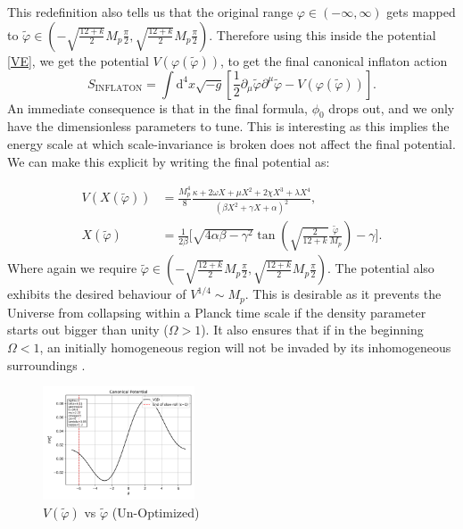 \documentclass[aps,prd,reprint,preprintnumbers,showpacs,floatfix,nofootinbib,superscript address]{revtex4-2}
\newcommand{\wb}[1]{{\color[RGB]{255,0,0}{\textbf{\textit{[WB: #1]}}}}}
\begin{document}
This redefinition also tells us that the original range $\varphi \in (-\infty,\infty)$ gets mapped to $\tilde{\varphi} \in \left( -\sqrt{\frac{12 + k}{2}}M_p \frac{\pi}{2},\sqrt{\frac{12 + k}{2}}M_p \frac{\pi}{2} \right)$. Therefore using this inside the potential \cref{VE}, we get the potential $V(\varphi(\tilde{\varphi}))$, to get the final canonical inflaton action
\begin{equation}
    S_{\text{INFLATON}} = \int \text{d}^4x \sqrt{-g} \left[ \frac{1}{2}\partial_\mu \tilde{\varphi}\partial^\mu \tilde{\varphi} - V(\varphi(\tilde{\varphi})) \right].
\end{equation}
An immediate consequence is that in the final formula, $\phi_0$ drops out, and we only have the dimensionless parameters to tune. This is interesting as this implies the energy scale at which scale-invariance is broken does not affect the final potential. We can make this explicit by writing the final potential as:

\begin{align}
    V(X(\tilde{\varphi})) &=  \frac{M_p^4}{8}  \frac{ \kappa + 2\omega X +\mu X^2 + 2\chi X^3 + \lambda X^4 }{(\beta X^2 + \gamma X + \alpha )^2} \label{Potential}, \\
    X(\tilde{\varphi}) &= \frac{1}{2\beta} \Biggl[ \sqrt{4\alpha\beta - \gamma^2} \tan\left(\sqrt{\frac{2}{12+k}}\frac{\tilde{\varphi}}{M_p}\right) - \gamma \Biggr]  \label{X}.
\end{align}
Where again we require $\tilde{\varphi} \in \left( -\sqrt{\frac{12 + k}{2}}M_p \frac{\pi}{2},\sqrt{\frac{12 + k}{2}}M_p \frac{\pi}{2} \right)$. The potential also exhibits the desired behaviour of $V^{1/4} \sim M_p$. This is desirable as it prevents the Universe from collapsing within a Planck time scale if the density parameter starts out bigger than unity ($\Omega > 1$). It also ensures that if in the beginning $\Omega < 1$, an initially homogeneous region will not be invaded by its inhomogeneous surroundings \cite{Liddle_Lyth_2000}.  
\begin{figure}[h!]
    \centering
    \includegraphics[width=0.4\textwidth]{Python/Figures/AE/inflation_plots/potential.png}
    \caption{$V(\tilde{\varphi})$ vs $\tilde{\varphi}$ (Un-Optimized)}
    \label{Canonical Potential vs Field1}
\end{figure}
\end{document}
